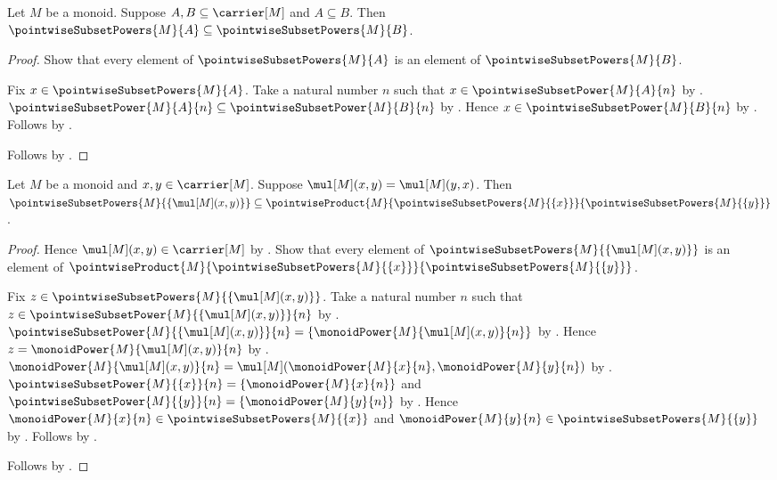 \begin{theorem}\label{pointwise_subset_powers_monotone}
    Let $M$ be a monoid.
    Suppose $A,B\subseteq\carrier[M]$ and $A\subseteq B$.
    Then $\pointwiseSubsetPowers{M}{A}
        \subseteq\pointwiseSubsetPowers{M}{B}$.
\end{theorem}
\begin{proof}
    Show that every element of $\pointwiseSubsetPowers{M}{A}$ is an element
        of $\pointwiseSubsetPowers{M}{B}$.
    \begin{subproof}
        Fix $x\in\pointwiseSubsetPowers{M}{A}$.
        Take a natural number $n$ such that
            $x\in\pointwiseSubsetPower{M}{A}{n}$ by
            .
        $\pointwiseSubsetPower{M}{A}{n}
            \subseteq\pointwiseSubsetPower{M}{B}{n}$ by
            .
        Hence $x\in\pointwiseSubsetPower{M}{B}{n}$ by .
        Follows by .
    \end{subproof}
    Follows by .
\end{proof}

\begin{theorem}\label{pointwise_subset_powers_singleton_product}
    Let $M$ be a monoid and $x,y\in\carrier[M]$.
    Suppose $\mul[M](x,y)=\mul[M](y,x)$.
    Then
        $\pointwiseSubsetPowers{M}{\{\mul[M](x,y)\}}
            \subseteq\pointwiseProduct{M}{
                \pointwiseSubsetPowers{M}{\{x\}}}{
                \pointwiseSubsetPowers{M}{\{y\}}}$.
\end{theorem}
\begin{proof}
    Hence $\mul[M](x,y)\in\carrier[M]$ by .
    Show that every element of
        $\pointwiseSubsetPowers{M}{\{\mul[M](x,y)\}}$ is an element of
        $\pointwiseProduct{M}{
            \pointwiseSubsetPowers{M}{\{x\}}}{
            \pointwiseSubsetPowers{M}{\{y\}}}$.
    \begin{subproof}
        Fix $z\in\pointwiseSubsetPowers{M}{\{\mul[M](x,y)\}}$.
        Take a natural number $n$ such that
            $z\in\pointwiseSubsetPower{M}{\{\mul[M](x,y)\}}{n}$ by
            .
        $\pointwiseSubsetPower{M}{\{\mul[M](x,y)\}}{n}
            =\{\monoidPower{M}{\mul[M](x,y)}{n}\}$ by
            .
        Hence $z=\monoidPower{M}{\mul[M](x,y)}{n}$ by
            .
        $\monoidPower{M}{\mul[M](x,y)}{n}
            =\mul[M](\monoidPower{M}{x}{n},
                \monoidPower{M}{y}{n})$ by
            .
        $\pointwiseSubsetPower{M}{\{x\}}{n}
            =\{\monoidPower{M}{x}{n}\}$ and
            $\pointwiseSubsetPower{M}{\{y\}}{n}
            =\{\monoidPower{M}{y}{n}\}$ by
            .
        Hence $\monoidPower{M}{x}{n}\in
                \pointwiseSubsetPowers{M}{\{x\}}$ and
            $\monoidPower{M}{y}{n}\in
                \pointwiseSubsetPowers{M}{\{y\}}$ by
            .
        Follows by .
    \end{subproof}
    Follows by .
\end{proof}
